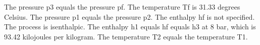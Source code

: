 The pressure p3 equals the pressure pf. The temperature Tf is 31.33 degrees Celsius. The pressure p1 equals the pressure p2. The enthalpy hf is not specified. The process is isenthalpic. The enthalpy h1 equals hf equals h3 at 8 bar, which is 93.42 kilojoules per kilogram. The temperature T2 equals the temperature T1.